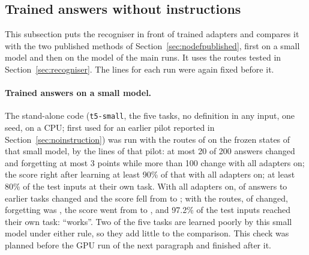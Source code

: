 \subsection{Trained answers without instructions}
\label{sec:nodeftrained}

This subsection puts the recogniser in front of trained adapters and compares it with the two published methods of Section~\ref{sec:nodefpublished}, first on a small model and then on the model of the main runs. It uses the routes tested in Section~\ref{sec:recogniser}. The lines for each run were again fixed before it.

\paragraph{Trained answers on a small model.} The stand-alone code (\texttt{t5-small}, the five tasks, no definition in any input, one seed, on a CPU; first used for an earlier pilot reported in Section~\ref{sec:noinstruction}) was run with the routes of \recog{} on the frozen states of that small model, by the lines of that pilot: at most 20 of 200 answers changed and forgetting at most 3 points while more than 100 change with all adapters on; the score right after learning at least 90\% of that with all adapters on; at least 80\% of the test inputs at their own task.
With all adapters on, \AudSmallAllChanged{} of \AudSmallAllCompared{} answers to earlier tasks changed and the score fell from \AudSmallAllLearned{} to \AudSmallAllAP{}; with the routes, \AudSmallRidgeChanged{} of \AudSmallRidgeCompared{} changed, forgetting was \AudSmallRidgeFT{}, the score went from \AudSmallRidgeLearned{} to \AudSmallRidgeAP{}, and 97.2\% of the test inputs reached their own task: ``works''.
Two of the five tasks are learned poorly by this small model under either rule, so they add little to the comparison. This check was planned before the GPU run of the next paragraph and finished after it.

